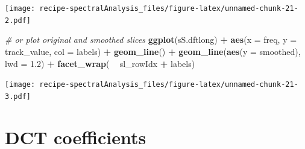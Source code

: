 \documentclass[]{book}
\newenvironment{Shaded}{\begin{snugshade}}{\end{snugshade}}
\newcommand{\CommentTok}[1]{\textcolor[rgb]{0.56,0.35,0.01}{\textit{#1}}}
\newcommand{\DataTypeTok}[1]{\textcolor[rgb]{0.13,0.29,0.53}{#1}}
\newcommand{\DecValTok}[1]{\textcolor[rgb]{0.00,0.00,0.81}{#1}}
\newcommand{\FloatTok}[1]{\textcolor[rgb]{0.00,0.00,0.81}{#1}}
\newcommand{\KeywordTok}[1]{\textcolor[rgb]{0.13,0.29,0.53}{\textbf{#1}}}
\newcommand{\NormalTok}[1]{#1}
\newcommand{\OperatorTok}[1]{\textcolor[rgb]{0.81,0.36,0.00}{\textbf{#1}}}
\newcommand{\StringTok}[1]{\textcolor[rgb]{0.31,0.60,0.02}{#1}}
\begin{document}
\begin{Shaded}
\end{Shaded}

\texttt{[image: recipe-spectralAnalysis\_files/figure-latex/unnamed-chunk-21-2.pdf]}

\begin{Shaded}
\begin{Highlighting}[]
\CommentTok{# or plot original and smoothed slices}
\KeywordTok{ggplot}\NormalTok{(sS.dftlong) }\OperatorTok{+}
\StringTok{  }\KeywordTok{aes}\NormalTok{(}\DataTypeTok{x =}\NormalTok{ freq, }\DataTypeTok{y =}\NormalTok{ track_value, }\DataTypeTok{col =}\NormalTok{ labels) }\OperatorTok{+}
\StringTok{  }\KeywordTok{geom_line}\NormalTok{() }\OperatorTok{+}
\StringTok{  }\KeywordTok{geom_line}\NormalTok{(}\KeywordTok{aes}\NormalTok{(}\DataTypeTok{y =}\NormalTok{ smoothed), }\DataTypeTok{lwd =} \FloatTok{1.2}\NormalTok{) }\OperatorTok{+}
\StringTok{  }\KeywordTok{facet_wrap}\NormalTok{( }\OperatorTok{~}\StringTok{ }\NormalTok{sl_rowIdx }\OperatorTok{+}\StringTok{ }\NormalTok{labels)}
\end{Highlighting}
\end{Shaded}

\texttt{[image: recipe-spectralAnalysis\_files/figure-latex/unnamed-chunk-21-3.pdf]}

\hypertarget{dct-coefficients}{%
\section{DCT coefficients}\label{dct-coefficients}}
\end{document}
